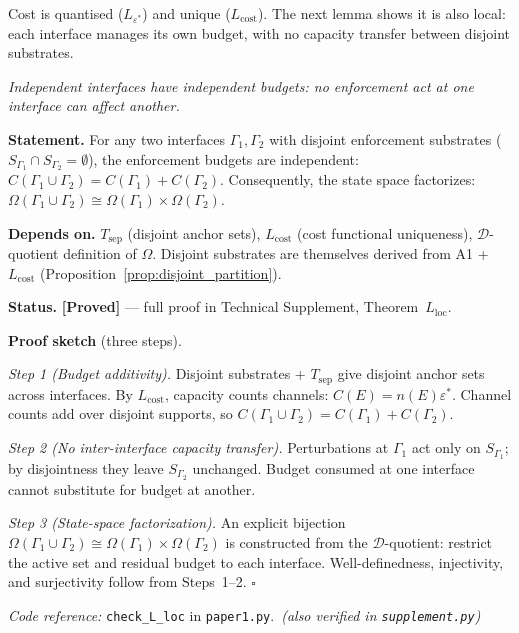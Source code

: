\documentclass[11pt]{article}
\theoremstyle{remark}
\newcommand{\coderef}[2]{\smallskip\noindent\textit{Code reference:} \texttt{#1} in \texttt{#2}.}
\begin{document}
\noindent Cost is quantised ($L_{\varepsilon^*}$) and unique ($L_{\mathrm{cost}}$).  The next lemma shows it is also local: each interface manages its own budget, with no capacity transfer between disjoint substrates.

\begin{tcolorbox}[apfbox, title={Lemma $L_{\mathrm{loc}}$ (Locality)}]
\textit{Independent interfaces have independent budgets: no enforcement act at one interface can affect another.}

\smallskip\noindent\textbf{Statement.}  For any two interfaces $\Gamma_1, \Gamma_2$ with disjoint enforcement substrates ($S_{\Gamma_1} \cap S_{\Gamma_2} = \emptyset$), the enforcement budgets are independent: $C(\Gamma_1 \cup \Gamma_2) = C(\Gamma_1) + C(\Gamma_2)$.  Consequently, the state space factorizes: $\Omega(\Gamma_1 \cup \Gamma_2) \cong \Omega(\Gamma_1) \times \Omega(\Gamma_2)$.

\smallskip\noindent\textbf{Depends on.}  $T_{\mathrm{sep}}$ (disjoint anchor sets), $L_{\mathrm{cost}}$ (cost functional uniqueness), $\mathcal{D}$-quotient definition of $\Omega$.  Disjoint substrates are themselves derived from A1 + $L_{\mathrm{cost}}$ (Proposition~\ref{prop:disjoint_partition}).

\smallskip\noindent\textbf{Status.}  \textbf{[Proved]} --- full proof in Technical Supplement, Theorem~$L_{\mathrm{loc}}$.

\smallskip\noindent\textbf{Proof sketch} (three steps).

\textit{Step 1 (Budget additivity).}  Disjoint substrates + $T_{\mathrm{sep}}$ give disjoint anchor sets across interfaces.  By $L_{\mathrm{cost}}$, capacity counts channels: $C(E) = n(E)\varepsilon^*$.  Channel counts add over disjoint supports, so $C(\Gamma_1 \cup \Gamma_2) = C(\Gamma_1) + C(\Gamma_2)$.

\textit{Step 2 (No inter-interface capacity transfer).}  Perturbations at $\Gamma_1$ act only on $S_{\Gamma_1}$; by disjointness they leave $S_{\Gamma_2}$ unchanged.  Budget consumed at one interface cannot substitute for budget at another.

\textit{Step 3 (State-space factorization).}  An explicit bijection $\Omega(\Gamma_1 \cup \Gamma_2) \cong \Omega(\Gamma_1) \times \Omega(\Gamma_2)$ is constructed from the $\mathcal{D}$-quotient: restrict the active set and residual budget to each interface.  Well-definedness, injectivity, and surjectivity follow from Steps~1--2.  \hfill$\square$

\coderef{check\_L\_loc}{paper1.py}\,%
\hspace{1em}\textit{(also verified in \texttt{supplement.py})}
\end{tcolorbox}
\end{document}
